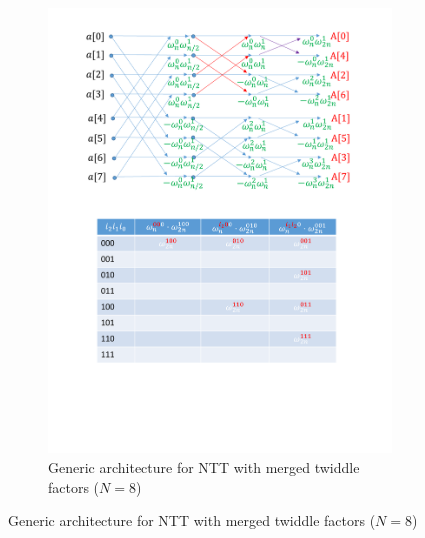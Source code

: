 \documentclass{iacrtrans}
\theoremstyle{plain}
\begin{document}
\begin{figure}[!tb]
\centering
\begin{subfigure}[t]{0.85\textwidth}\centering
\includegraphics[width=\textwidth]{./fig/DIT1.pdf}
\caption{Generic architecture for NTT with merged twiddle factors ($N=8$)}
\label{fig:dit1}
\end{subfigure}



\end{figure}
\end{document}
